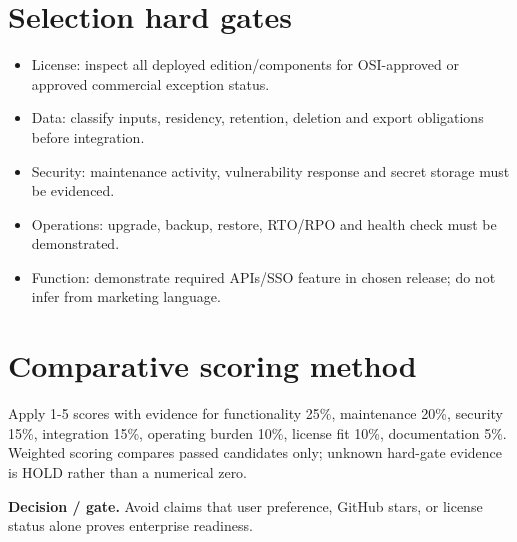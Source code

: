 \documentclass[10pt,letterpaper]{article}
\begin{document}
\section{Selection hard gates}
\begin{itemize}
\item License: inspect all deployed edition/components for OSI-approved or approved commercial exception status.
\item Data: classify inputs, residency, retention, deletion and export obligations before integration.
\item Security: maintenance activity, vulnerability response and secret storage must be evidenced.
\item Operations: upgrade, backup, restore, RTO/RPO and health check must be demonstrated.
\item Function: demonstrate required APIs/SSO feature in chosen release; do not infer from marketing language.
\end{itemize}
\section{Comparative scoring method}
Apply 1-5 scores with evidence for functionality 25\%, maintenance 20\%, security 15\%, integration 15\%, operating burden 10\%, license fit 10\%, documentation 5\%. Weighted scoring compares passed candidates only; unknown hard-gate evidence is HOLD rather than a numerical zero.\par
\textbf{Decision / gate.} Avoid claims that user preference, GitHub stars, or license status alone proves enterprise readiness.\par
\end{document}
